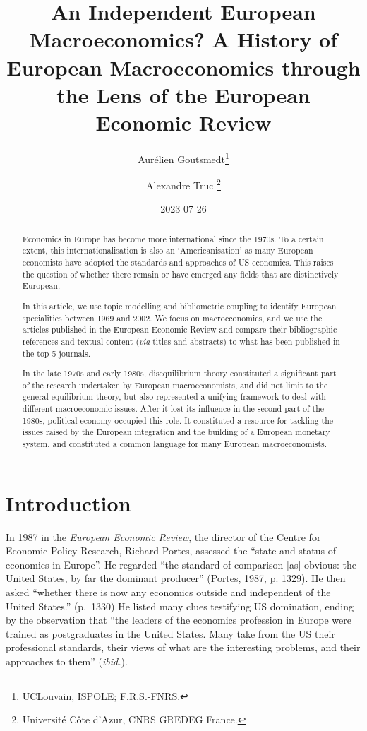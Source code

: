 \documentclass[
  12pt,
  onecolumn]{article}
\title{An Independent European Macroeconomics? A History of European Macroeconomics through the Lens of the European Economic Review}
\author{Aurélien Goutsmedt\footnote{UCLouvain, ISPOLE; F.R.S.-FNRS.} \and Alexandre Truc \footnote{Université Côte d'Azur, CNRS GREDEG France.}}
\date{2023-07-26}
\begin{document}
\maketitle
\begin{abstract}
Economics in Europe has become more international since the 1970s. To a certain extent, this internationalisation is also an `Americanisation' as many European economists have adopted the standards and approaches of US economics. This raises the question of whether there remain or have emerged any fields that are distinctively European.

In this article, we use topic modelling and bibliometric coupling to identify European specialities between 1969 and 2002. We focus on macroeconomics, and we use the articles published in the European Economic Review and compare their bibliographic references and textual content (\emph{via} titles and abstracts) to what has been published in the top 5 journals.

In the late 1970s and early 1980s, disequilibrium theory constituted a significant part of the research undertaken by European macroeconomists, and did not limit to the general equilibrium theory, but also represented a unifying framework to deal with different macroeconomic issues. After it lost its influence in the second part of the 1980s, political economy occupied this role. It constituted a resource for tackling the issues raised by the European integration and the building of a European monetary system, and constituted a common language for many European macroeconomists.
\end{abstract}

\hypertarget{introduction}{%
\section{Introduction}\label{introduction}}

In 1987 in the \emph{European Economic Review}, the director of the Centre for Economic Policy Research, Richard Portes, assessed the ``state and status of economics in Europe''. He regarded ``the standard of comparison {[}as{]} obvious: the United States, by far the dominant producer'' (\protect\hyperlink{ref-portes1987}{Portes, 1987, p. 1329}). He then asked ``whether there is now any economics outside and independent of the United States.'' (p.~1330) He listed many clues testifying US domination, ending by the observation that ``the leaders of the economics profession in Europe were trained as postgraduates in the United States. Many take from the US their professional standards, their views of what are the interesting problems, and their approaches to them'' (\emph{ibid.}).
\end{document}
